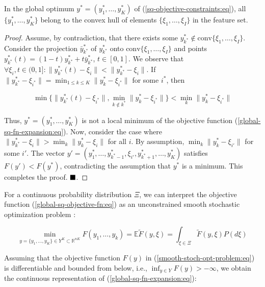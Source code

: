 \begin{lemma}
    \label{Lemma 1} In the global optimum $y^* = (y_1^*, \ldots, y_K^*)$ of (\ref{sq-objective-constraints:eq}), all $\{y_1^*, \ldots, y_K^*\}$ belong to the convex hull of elements $\{\xi_1, \ldots, \xi_I\}$ in the feature set.
\end{lemma}
\begin{proof}
    Assume, by contradiction, that there exists some $y_{k^*}^* \notin \text{conv}\{\xi_1, \ldots, \xi_I\}$. Consider the projection $\bar{y}_{k^*}^*$ of $y_{k^*}^*$ onto $\text{conv}\{\xi_1, \ldots, \xi_I\}$ and points $y_{k^*}^*(t) = (1 - t)y_{k^*}^* + t\bar{y}_{k^*}^*$, $t \in [0, 1]$. We observe that $\forall \xi_i, t \in (0, 1]: \|y_{k^*}^*(t) - \xi_i\| < \|y_{k^*}^* - \xi_i\|$. If $\|y_{k^*}^* - \xi_{i^*}\| = \min_{1 \leq k \leq K} \|y_k^* - \xi_{i^*}\|$ for some $i^*$, then

    \begin{equation}
        \min\{\| y_{k^*}^*(t) - \xi_{i^*} \|, \min_{k \notin k^*} \| y_k^* - \xi_{i^*} \|\} < \min_k \| y_k^* - \xi_{i^*} \|
    \end{equation}

    \noindent Thus, $y^* = (y_1^*, \ldots, y_K^*)$ is not a local minimum of the objective function (\ref{global-sq-fn-expansion:eq}). Now, consider the case where $ \| y_{k^*}^* - \xi_i \| > \min_k \| y_k^* - \xi_i \|$ for all $i$. By assumption, $\min_k \| y_k^* - \xi_{i'} \|$ for some $i'$. The vector $y' = (y_1^*, \ldots, y_{k^* - 1}^*, \xi_{i'}, y_{k^* + 1}^*, \ldots, y_K^*)$ satisfies $F(y') < F(y^*)$, contradicting the assumption that $y^*$ is a minimum. This completes the proof. $ \qed $.
\end{proof}

For a continuous probability distribution $\Xi$, we can interpret the objective function (\ref{global-sq-objective-fn:eq}) as an unconstrained smooth stochastic optimization problem \cite{ermoliev1976stochastic,Newton_Yousefian_Pasupathy_2018,Norkin_Kozyriev_Norkin_2024}:

\begin{equation}
    \label{smooth-stoch-opt-problem:eq}
        \min_{y = \{ y_1, \ldots, y_K \} \in Y^K \subset \mathbb{R}^{nK}} F(y_1, \ldots, y_k) = \mathbb{E} \tilde{F}(y, \xi) = \int_{\xi \in \Xi} \tilde{F}(y, \xi) P(d \xi)
\end{equation}

Assuming that the objective function $F(y)$ in (\ref{smooth-stoch-opt-problem:eq}) is differentiable and bounded from below, i.e., $\inf_{y \in Y} F(y) > -\infty$, we obtain the continuous representation of (\ref{global-sq-fn-expansion:eq}):

